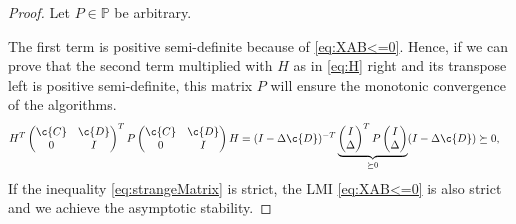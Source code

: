 \begin{proof}
	Let $P \in \mathbb{P}$ be arbitrary. 
	
	The first term is positive semi-definite because of \eqref{eq:XAB<=0}.
	Hence, if we can prove that the second term multiplied with $H$ as in \eqref{eq:H} right and its transpose left is positive semi-definite, this matrix $P$ will ensure the monotonic convergence of the algorithms.
	\begin{align*}
	&H^T\begin{pmatrix}
	\c{C} & \c{D} \\ 0 & I
	\end{pmatrix}^T
	P
	\begin{pmatrix}
	\c{C} & \c{D} \\ 0 & I
	\end{pmatrix} H  = 
	(I - \Delta \c{D})^{-T} \underbrace{\begin{pmatrix}
		I \\ \Delta 
		\end{pmatrix}^T P
		\begin{pmatrix}
		I \\ \Delta 
		\end{pmatrix}}_{\succeq 0}(I - \Delta \c{D})
	\succeq 0,
	\end{align*}
	If the inequality \eqref{eq:strangeMatrix} is strict, the LMI \eqref{eq:XAB<=0} is also strict and we achieve the asymptotic stability. 
	

\end{proof}
